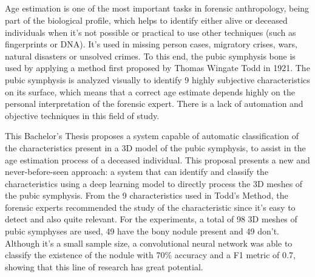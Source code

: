 \thispagestyle{empty}


\begin{center}
{\large\bfseries \myTitleENG} \\
\end{center}
\begin{center}
\myName \\
\end{center}

\vspace{0.7cm}
 \\

\vspace{0.7cm}
 \\

Age estimation is one of the most important tasks in forensic anthropology, being part of the biological profile, which helps to identify either alive or deceased individuals when it's not possible or practical to use other techniques (such as fingerprints or DNA). It's used in missing person cases, migratory crises, wars, natural disasters or unsolved crimes. To this end, the pubic symphysis bone is used by applying a method first proposed by Thomas Wingate Todd in 1921. The pubic symphysis is analyzed visually to identify 9 highly subjective characteristics on its surface, which means that a correct age estimate depends highly on the personal interpretation of the forensic expert. There is a lack of automation and objective techniques in this field of study.

This Bachelor's Thesis proposes a system capable of automatic classification of the characteristics present in a 3D model of the pubic symphysis, to assist in the age estimation process of a deceased individual. This proposal presents a new and never-before-seen approach: a system that can identify and classify the characteristics using a deep learning model to directly process the 3D meshes of the pubic symphysis. From the 9 characteristics used in Todd's Method, the forensic experts recommended the study of the  characteristic since it's easy to detect and also quite relevant. For the experiments, a total of 98 3D meshes of pubic symphyses are used, 49 have the bony nodule present and 49 don't. Although it's a small sample size, a convolutional neural network was able to classify the existence of the nodule with 70\% accuracy and a F1 metric of 0.7, showing that this line of research has great potential.

